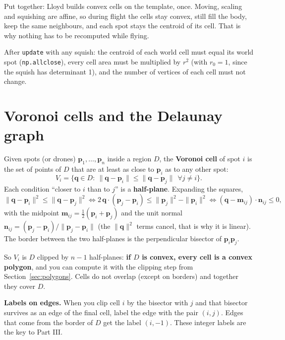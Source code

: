 \documentclass[11pt,a4paper]{article}
\newcommand{\vect}[1]{\mathbf{#1}}
\begin{document}
\begin{plainbox}
Put together: Lloyd builds convex cells on the template, once. Moving, scaling and squishing are affine, so during
flight the cells stay convex, still fill the body, keep the same neighbours, and each spot stays the centroid of its
cell. That is why nothing has to be recomputed while flying.
\end{plainbox}

\begin{testbox}
After \texttt{update} with any squish: the centroid of each world cell must equal its world spot
(\texttt{np.allclose}), every cell area must be multiplied by $r^2$ (with $r_0=1$, since the squish has determinant 1), and the
number of vertices of each cell must not change.
\end{testbox}

\section{Voronoi cells and the Delaunay graph}\label{sec:voronoi}

Given spots (or drones) $\vect{p}_1,\dots,\vect{p}_n$ inside a region $D$, the \textbf{Voronoi cell} of spot $i$ is
the set of points of $D$ that are at least as close to $\vect{p}_i$ as to any other spot:
\[
V_i=\{\vect{q}\in D:\ \|\vect{q}-\vect{p}_i\|\le\|\vect{q}-\vect{p}_j\|\ \ \forall j\ne i\}.
\]
Each condition ``closer to $i$ than to $j$'' is a \textbf{half-plane}. Expanding the squares,
\[
\|\vect{q}-\vect{p}_i\|^2\le\|\vect{q}-\vect{p}_j\|^2
\iff 2\,\vect{q}\cdot(\vect{p}_j-\vect{p}_i)\le\|\vect{p}_j\|^2-\|\vect{p}_i\|^2
\iff (\vect{q}-\vect{m}_{ij})\cdot\vect{n}_{ij}\le0,
\]
with the midpoint $\vect{m}_{ij}=\tfrac12(\vect{p}_i+\vect{p}_j)$ and the unit normal
$\vect{n}_{ij}=(\vect{p}_j-\vect{p}_i)/\|\vect{p}_j-\vect{p}_i\|$ (the $\|\vect{q}\|^2$ terms cancel, that is why it is
linear). The border between the two half-planes is the perpendicular bisector of $\vect{p}_i\vect{p}_j$.

So $V_i$ is $D$ clipped by $n-1$ half-planes: \textbf{if $D$ is convex, every cell is a convex polygon}, and you can
compute it with the clipping step from Section~\ref{sec:polygons}. Cells do not overlap (except on borders) and
together they cover $D$.

\textbf{Labels on edges.} When you clip cell $i$ by the bisector with $j$ and that bisector survives as an edge of the
final cell, label the edge with the pair $(i,j)$. Edges that come from the border of $D$ get the label $(i,-1)$. These
integer labels are the key to Part III.
\end{document}
